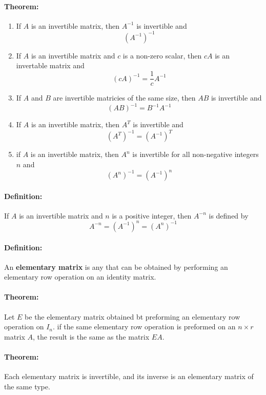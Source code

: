 \documentclass[12pt]{article}
\newenvironment{theorem}{\paragraph{Theorem:\hfill}}{\hfill}
\newenvironment{definition}{\paragraph{Definition: }}{\hfill}
\begin{document}
\begin{theorem}
	\begin{enumerate}
		\item If $A$ is an invertible matrix, then $A^{-1}$ is invertible and
		\[
			(A^{-1})^{-1}
		\]
		\item If $A$ is an invertible matrix and $c$ is a non-zero scalar, then $cA$ is an invertable matrix and
		\[
			(cA)^{-1} = \frac{1}{c}A^{-1}
		\]
		\item If $A$ and $B$ are invertible matricies of the same size, then $AB$ is invertible and 
		\[
			(AB)^{-1} = B^{-1} A^{-1}
		\]
		\item If $A$ is an invertible matrix, then $A^T$ is invertible and
		\[
			(A^T)^{-1} = (A^{-1})^T
		\]
		\item if $A$ is an invertible matrix, then $A^n$ is invertible for all non-negative integers $n$ and 
		\[
			(A^n)^{-1} = (A^{-1})^n
		\]
	\end{enumerate}
\end{theorem}

\begin{definition}
	If $A$ is an invertible matrix and $n$ is a positive integer, then $A^{-n}$ is defined by
	\[
		A^{-n} = (A^{-1})^n = (A^n)^{-1}
	\]
\end{definition}

\begin{definition}
	An \textbf{elementary matrix} is any that can be obtained by performing an elementary row operation on an identity matrix.
\end{definition}

\begin{theorem}
	Let $E$ be the elementary matrix obtained bt preforming an elementary row operation on $I_n$. if the same elementary row operation is preformed on an $n \times r$ matrix $A$, the result is the same as the matrix $EA$.
\end{theorem}

\begin{theorem}
	Each elementary matrix is invertible, and its inverse is an elementary matrix of the same type.
\end{theorem}
\end{document}
